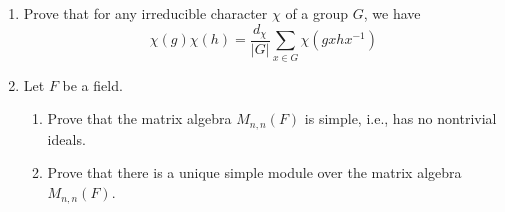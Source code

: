 \documentclass[../psets.tex]{subfiles}
\begin{document}
\begin{enumerate}
    \item Prove that for any irreducible character $\chi$ of a group $G$, we have
    \begin{equation*}
        \chi(g)\chi(h) = \frac{d_\chi}{|G|}\sum_{x\in G}\chi(gxhx^{-1})
    \end{equation*}
    \item Let $F$ be a field.
    \begin{enumerate}
        \item Prove that the matrix algebra $M_{n,n}(F)$ is simple, i.e., has no nontrivial ideals.
        \item Prove that there is a unique simple module over the matrix algebra $M_{n,n}(F)$.

\end{enumerate}
\end{enumerate}
\end{document}
